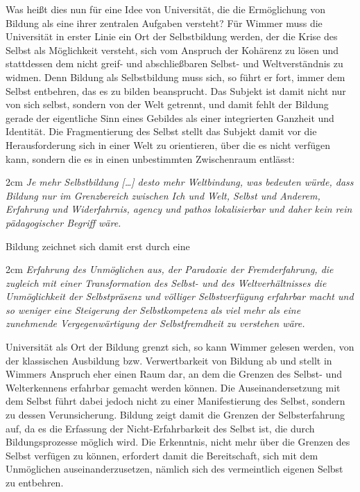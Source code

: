 \documentclass[11pt]{article}
\newenvironment{myenv}{\begin{adjustwidth}{2cm}{}}{\end{adjustwidth}}
\begin{document}
Was heißt dies nun für eine Idee von Universität,
die die Ermöglichung von Bildung als eine ihrer zentralen Aufgaben versteht?
Für Wimmer muss die Universität in erster Linie ein Ort der Selbstbildung
werden, der die Krise des Selbst als Möglichkeit versteht, sich vom Anspruch
der Kohärenz zu lösen und stattdessen dem nicht greif- und abschließbaren
Selbst- und Weltverständnis zu widmen.  Denn Bildung als Selbstbildung muss
sich, so führt er fort, immer dem Selbst entbehren, das es zu bilden
beansprucht. Das Subjekt ist damit nicht nur von sich selbst, sondern von der
Welt getrennt, und damit fehlt der Bildung \glqq gerade der eigentliche Sinn eines
Gebildes als einer integrierten Ganzheit und Identität.\grqq \footnotemark {}  Die Fragmentierung
des Selbst stellt das Subjekt damit vor die Herausforderung sich in einer Welt
zu orientieren, über die es nicht verfügen kann, sondern die es in einen
unbestimmten Zwischenraum entlässt: 
\begin{myenv}
  \textit{ \glqq Je mehr Selbstbildung […] desto mehr
Weltbindung, was bedeuten würde, dass Bildung nur im Grenzbereich zwischen Ich
und Welt, Selbst und Anderem, Erfahrung und Widerfahrnis, agency und pathos
lokalisierbar und daher kein rein pädagogischer Begriff wäre.\grqq}
\footnotemark {}  
\end{myenv}

Bildung
zeichnet sich damit erst durch eine 
\begin{myenv}
  \textit{\glqq [...]Erfahrung des Unmöglichen aus, der
Paradoxie der Fremderfahrung, die zugleich mit einer Transformation des Selbst-
und des Weltverhältnisses die Unmöglichkeit der Selbstpräsenz und völliger
Selbstverfügung erfahrbar macht und so weniger eine Steigerung der
Selbstkompetenz als viel mehr als eine zunehmende Vergegenwärtigung der
Selbstfremdheit zu verstehen wäre.\grqq}
\footnotemark {}  
\end{myenv}

Universität als Ort der Bildung grenzt sich, so kann Wimmer gelesen werden, von
der klassischen Ausbildung bzw. Verwertbarkeit von Bildung ab und stellt in
Wimmers Anspruch eher einen Raum dar, an dem die Grenzen des Selbst- und
Welterkennens erfahrbar gemacht werden können. Die Auseinandersetzung mit dem
Selbst führt dabei jedoch nicht zu einer Manifestierung des Selbst, sondern zu
dessen Verunsicherung. Bildung zeigt damit die Grenzen der Selbsterfahrung auf,
da es die Erfassung der Nicht-Erfahrbarkeit des Selbst ist, die durch
Bildungsprozesse möglich wird. Die Erkenntnis, nicht mehr über die Grenzen des
Selbst verfügen zu können, erfordert damit die Bereitschaft, sich mit dem
Unmöglichen auseinanderzusetzen, nämlich sich des vermeintlich eigenen Selbst
zu entbehren.  
\end{document}
